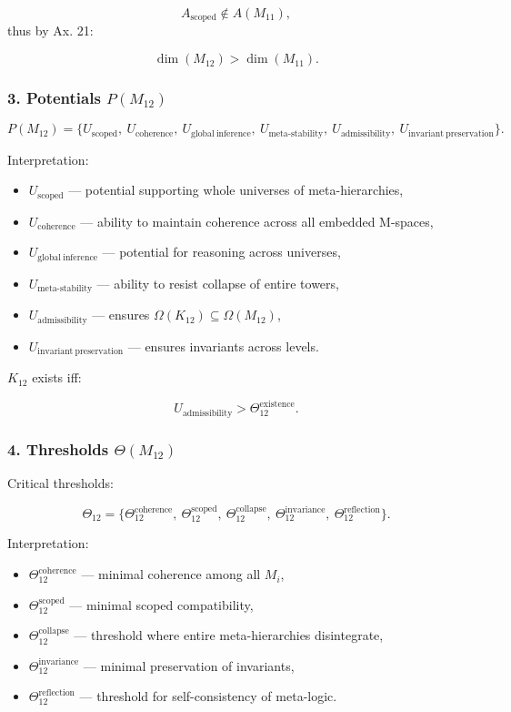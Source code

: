 \[
A_{\mathrm{scoped}}\notin A(M_{11}),
\]
thus by Ax. 21:

\[
\dim(M_{12}) > \dim(M_{11}).
\]

\subsubsection*{3. Potentials $P(M_{12})$}

\[
P(M_{12}) =
\{
U_{\mathrm{scoped}},\
U_{\mathrm{coherence}},\
U_{\mathrm{global\ inference}},\
U_{\mathrm{meta\mbox{-}stability}},\
U_{\mathrm{admissibility}},\
U_{\mathrm{invariant\ preservation}}
\}.
\]

Interpretation:

\begin{itemize}
    \item $U_{\mathrm{scoped}}$ — potential supporting whole universes of meta-hierarchies,
    \item $U_{\mathrm{coherence}}$ — ability to maintain coherence across all embedded M-spaces,
    \item $U_{\mathrm{global\ inference}}$ — potential for reasoning across universes,
    \item $U_{\mathrm{meta\mbox{-}stability}}$ — ability to resist collapse of entire towers,
    \item $U_{\mathrm{admissibility}}$ — ensures $\Omega(K_{12})\subseteq\Omega(M_{12})$,
    \item $U_{\mathrm{invariant\ preservation}}$ — ensures invariants across levels.
\end{itemize}

$K_{12}$ exists iff:

\[
U_{\mathrm{admissibility}} > \Theta_{12}^{\mathrm{existence}}.
\]

\subsubsection*{4. Thresholds $\Theta(M_{12})$}

Critical thresholds:

\[
\Theta_{12}=
\{
\Theta_{12}^{\mathrm{coherence}},\
\Theta_{12}^{\mathrm{scoped}},\
\Theta_{12}^{\mathrm{collapse}},\
\Theta_{12}^{\mathrm{invariance}},\
\Theta_{12}^{\mathrm{reflection}}
\}.
\]

Interpretation:

\begin{itemize}
    \item $\Theta_{12}^{\mathrm{coherence}}$ — minimal coherence among all $M_i$,
    \item $\Theta_{12}^{\mathrm{scoped}}$ — minimal scoped compatibility,
    \item $\Theta_{12}^{\mathrm{collapse}}$ — threshold where entire meta-hierarchies disintegrate,
    \item $\Theta_{12}^{\mathrm{invariance}}$ — minimal preservation of invariants,
    \item $\Theta_{12}^{\mathrm{reflection}}$ — threshold for self-consistency of meta-logic.
\end{itemize}

